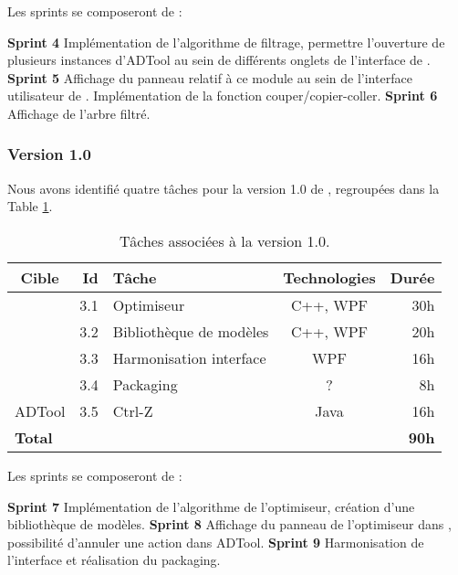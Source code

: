 		Les sprints se composeront de :
		
		\textbf{Sprint 4} Implémentation de l'algorithme de filtrage, permettre l'ouverture de plusieurs instances d'ADTool au sein de différents onglets de l'interface de \glasir{}.\newline 
		\textbf{Sprint 5} Affichage du panneau relatif à ce module au sein de l'interface utilisateur de \glasir{}. Implémentation de la fonction couper/copier-coller.\newline %
		\textbf{Sprint 6} Affichage de l'arbre filtré.

	\subsubsection{Version 1.0}
		Nous avons identifié quatre tâches pour la version 1.0 de \glasir{}, regroupées dans la {\sc Table} \ref{tab:taches_units_3}.
		\begin{table}[h]
			\centering
			\begin{tabular}{|c|r|l|c|r|}
				\hline
				\textbf{Cible} & \textbf{Id} & \textbf{Tâche} & \textbf{Technologies} & \textbf{Durée}\\
				\hline

				\multirow{4}{*}{\glasir{}} & 3.1 & Optimiseur & C++, WPF & 30h\\
				\cline{2-5}
				 & 3.2 & Bibliothèque de modèles & C++, WPF & 20h\\
				\cline{2-5}
				 & 3.3 & Harmonisation interface & WPF & 16h\\
				\cline{2-5}
				 & 3.4 & Packaging & ? & 8h\\
				\hline

				\multirow{1}{*}{ADTool} & 3.5 & Ctrl-Z & \multirow{1}{*}{Java} & 16h\\
				\hline

				\multicolumn{4}{|l|}{\bf Total} & {\bf 90h}\\
				\hline
			\end{tabular}
			\caption{Tâches associées à la version 1.0.}
			\label{tab:taches_units_3}
		\end{table}
		
		Les sprints se composeront de :		
		
		\textbf{Sprint 7} Implémentation de l'algorithme de l'optimiseur, création d'une bibliothèque de modèles.\newline
		\textbf{Sprint 8} Affichage du panneau de l'optimiseur dans \glasir{}, possibilité d'annuler une action dans ADTool.\newline
		\textbf{Sprint 9} Harmonisation de l'interface et réalisation du packaging. \newline

